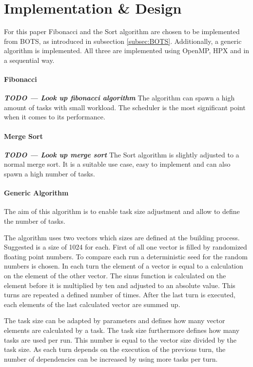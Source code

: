 \section{Implementation \& Design}
  For this paper Fibonacci and the Sort algorithm are chosen to be implemented from BOTS, as introduced in subsection \ref{subsec:BOTS}.
  Additionally, a generic algorithm is implemented.
  All three are implemented using OpenMP, HPX and in a sequential way.
  
  \paragraph{Fibonacci}
  \textit{\textbf{TODO --- Look up fibonacci algorithm}}
  The algorithm can spawn a high amount of tasks with small workload.
  The scheduler is the most significant point when it comes to its performance.
  
  \paragraph{Merge Sort}
  \textit{\textbf{TODO --- Look up merge sort}}
  The Sort algorithm is slightly adjusted to a normal merge sort.
  It is a suitable use case, easy to implement and can also spawn a high number of tasks.

  \paragraph{Generic Algorithm}
  The aim of this algorithm is to enable task size adjustment and allow to define the number of tasks.
  
  The algorithm uses two vectors which sizes are defined at the building process.
  Suggested is a size of 1024 for each.
  First of all one vector is filled by randomized floating point numbers.
  To compare each run a deterministic seed for the random numbers is chosen.
  In each turn the element of a vector is equal to a calculation on the element of the other vector.
  The sinus function is calculated on the element before it is multiplied by ten and adjusted to an absolute value.
  This turns are repeated a defined number of times.
  After the last turn is executed, each elements of the last calculated vector are summed up.

  The task size can be adapted by parameters and defines how many vector elements are calculated by a task.
  The task size furthermore defines how many tasks are used per run.
  This number is equal to the vector size divided by the task size.
  As each turn depends on the execution of the previous turn, the number of dependencies can be increased by using more tasks per turn.
		
